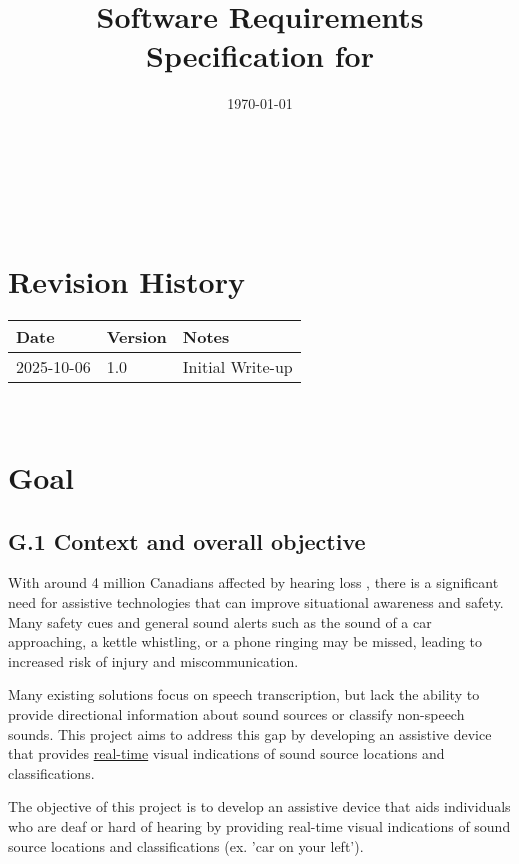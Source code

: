 \documentclass[12pt]{article}
\theoremstyle{definition}
\begin{document}
\title{Software Requirements Specification for \progname} 
\author{\authname}
\date{\today}
	
\maketitle

~\newpage


\tableofcontents

~\newpage

\section*{Revision History}


\begin{tabularx}{\textwidth}{p{3cm}p{2cm}X} \toprule {\bf Date} & {\bf Version}
& {\bf Notes}\\
\midrule
2025-10-06 & 1.0 & Initial Write-up\\
\bottomrule
\end{tabularx}


~\newpage


\section{Goal}

\subsection{G.1 Context and overall objective}

With around 4 million Canadians affected by hearing loss \cite{Healthing2025},
there is a significant need for assistive technologies that can improve
situational awareness and safety. Many safety cues and general sound alerts such
as the sound of a car approaching, a kettle whistling, or a phone ringing may be
missed, leading to increased risk of injury and miscommunication.

Many existing solutions focus on speech transcription, but lack the ability to
provide directional information about sound sources or classify non-speech
sounds. This project aims to address this gap by developing an assistive device
that provides \hyperref[def:real_time]{real-time} visual indications of sound
source locations and classifications.

The objective of this project is to develop an assistive device that aids
individuals who are deaf or hard of hearing by providing real-time visual
indications of sound source locations and classifications (ex. 'car on your
left').
\end{document}
